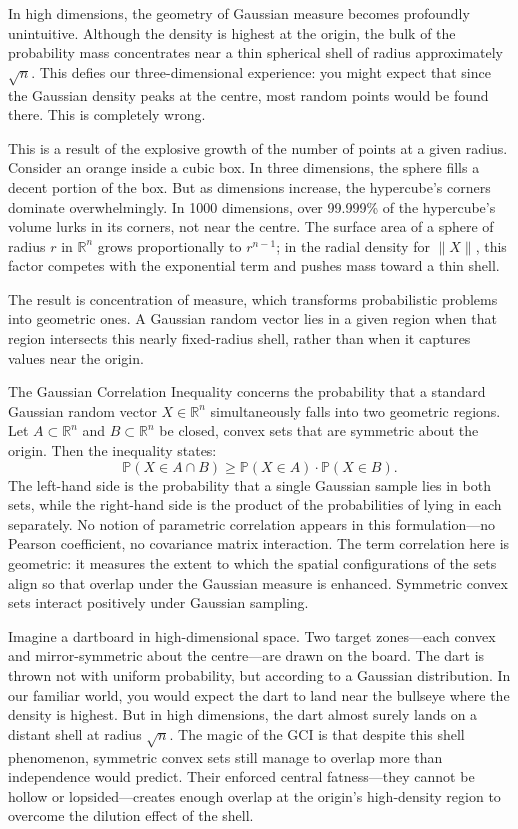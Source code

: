 In high dimensions, the geometry of Gaussian measure becomes profoundly unintuitive. Although the density is highest at the origin, the bulk of the probability mass concentrates near a thin spherical shell of radius approximately \( \sqrt{n} \). This defies our three-dimensional experience: you might expect that since the Gaussian density peaks at the centre, most random points would be found there. This is completely wrong.

This is a result of the explosive growth of the number of points at a given radius. Consider an orange inside a cubic box. In three dimensions, the sphere fills a decent portion of the box. But as dimensions increase, the hypercube's corners dominate overwhelmingly. In 1000 dimensions, over 99.999\% of the hypercube's volume lurks in its corners, not near the centre. The surface area of a sphere of radius \( r \) in \( \mathbb{R}^n \) grows proportionally to \( r^{n-1} \); in the radial density for \( \|X\| \), this factor competes with the exponential term and pushes mass toward a thin shell.

The result is concentration of measure, which transforms probabilistic problems into geometric ones. A Gaussian random vector lies in a given region when that region intersects this nearly fixed-radius shell, rather than when it captures values near the origin.

The Gaussian Correlation Inequality concerns the probability that a standard Gaussian random vector \( X \in \mathbb{R}^n \) simultaneously falls into two geometric regions. Let \( A \subset \mathbb{R}^n \) and \( B \subset \mathbb{R}^n \) be closed, convex sets that are symmetric about the origin. Then the inequality states:
\[
\mathbb{P}(X \in A \cap B) \geq \mathbb{P}(X \in A) \cdot \mathbb{P}(X \in B).
\]
The left-hand side is the probability that a single Gaussian sample lies in both sets, while the right-hand side is the product of the probabilities of lying in each separately. No notion of parametric correlation appears in this formulation—no Pearson coefficient, no covariance matrix interaction. The term \QSOpen{}correlation\QSClose{} here is geometric: it measures the extent to which the spatial configurations of the sets align so that overlap under the Gaussian measure is enhanced. Symmetric convex sets interact positively under Gaussian sampling.

Imagine a dartboard in high-dimensional space. Two target zones—each convex and mirror-symmetric about the centre—are drawn on the board. The dart is thrown not with uniform probability, but according to a Gaussian distribution. In our familiar world, you would expect the dart to land near the bullseye where the density is highest. But in high dimensions, the dart almost surely lands on a distant shell at radius \( \sqrt{n} \). The magic of the GCI is that despite this shell phenomenon, symmetric convex sets still manage to overlap more than independence would predict. Their enforced central fatness—they cannot be hollow or lopsided—creates enough overlap at the origin's high-density region to overcome the dilution effect of the shell.

